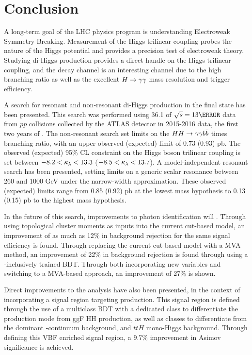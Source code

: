 \chapter{Conclusion}

A long-term goal of the \gls{LHC} physics program is understanding Electroweak Symmetry Breaking. Measurement of the Higgs trilinear coupling probes the nature of the Higgs potential and provides a precision test of electroweak theory. Studying di-Higgs production provides a direct handle on the Higgs trilinear coupling, and the \yybb decay channel is an interesting channel due to the high \Hbb branching ratio as well as the excellent $H\rightarrow \gamma\gamma$ mass resolution and trigger efficiency.

A search for resonant and non-resonant di-Higgs production in the \yybb final state has been presented. This search was performed using 36.1 \ifb of $\sqs = \unit{13}{\TeV}$ data from $pp$ collisions collected by the ATLAS detector in 2015-2016 data, the first two years of \RunTwo. The non-resonant search set limits on the $HH\rightarrow\gamma\gamma b\bar{b}$ \xsec times branching ratio, with an upper observed (expected) limit of 0.73 (0.93) pb. The observed (expected) 95\% \gls{CL} constraint on the Higgs boson trilinear coupling is set between $-8.2 < \kappa_{\lambda} < 13.3$ ($-8.5 < \kappa_{\lambda} < 13.7$). A model-independent resonant search has been presented, setting limits on a generic scalar resonance between 260 and 1000 GeV under the narrow-width approximation. These observed (expected) limits range from 0.85 (0.92) pb at the lowest mass hypothesis to 0.13 (0.15) pb to the highest mass hypothesis.

In the future of this search, improvements to photon identification will . Through using topological cluster moments as inputs into the current cut-based model, an improvement of as much as 12\% in background rejection for the same signal efficiency is found. Through replacing the current cut-based model with a \gls{MVA} method, an improvement of 22\% in background rejection is found through using a \pt-inclusively trained \gls{BDT}. Through both incorporating new variables and switching to a \gls{MVA}-based approach, an improvement of 27\% is shown.

Direct improvements to the analysis have also been presented, in the context of incorporating a signal region targeting  production. This signal region is defined through the use of a multiclass \gls{BDT} with a dedicated class to differentiate the production mode from ggF HH production, as well as classes to differentiate from the dominant \yy-continuum background, and $ttH$ mono-Higgs background. Through defining this \gls{VBF} enriched signal region, a 9.7\% improvement in Asimov significance is achieved. 